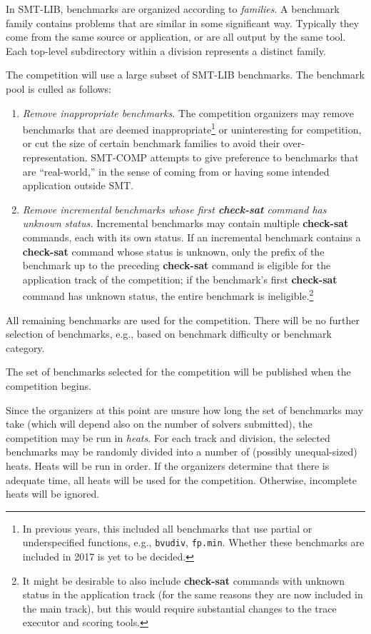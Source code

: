 \documentclass[12pt]{article}
\newcommand{\akey}[1]{\textbf{#1}}
\begin{document}
%
In SMT-LIB, benchmarks are organized according to \emph{families}.  A
benchmark family contains problems that are similar in some
significant way.  Typically they come from the same source or
application, or are all output by the same tool.  Each top-level
subdirectory within a division represents a distinct family.

%
The competition will use a large subset of SMT-LIB benchmarks.  The
benchmark pool is culled as follows:
\begin{enumerate}
\item \emph{Remove inappropriate benchmarks.} The competition
  organizers may remove benchmarks that are deemed
  inappropriate\footnote{In previous years, this included all
    benchmarks that use partial or underspecified functions, e.g.,
    \texttt{bvudiv}, \texttt{fp.min}.  Whether these benchmarks are
    included in 2017 is yet to be decided.} or uninteresting for
  competition, or cut the size of certain benchmark families to avoid
  their over-representation.  SMT-COMP attempts to give preference to
  benchmarks that are ``real-world,'' in the sense of coming from or
  having some intended application outside SMT.
\item \emph{Remove incremental benchmarks whose first \akey{check-sat}
  command has unknown status.}  Incremental benchmarks may contain
  multiple \akey{check-sat} commands, each with its own status.  If an
  incremental benchmark contains a \akey{check-sat} command whose
  status is unknown, only the prefix of the benchmark up to the
  preceding \akey{check-sat} command is eligible for the application
  track of the competition; if the benchmark's first \akey{check-sat}
  command has unknown status, the entire benchmark is
  ineligible.\footnote{It might be desirable to also include
    \akey{check-sat} commands with unknown status in the application
    track (for the same reasons they are now included in the main
    track), but this would require substantial changes to the trace
    executor and scoring tools.}
\end{enumerate}
%
All remaining benchmarks are used for the competition.  There will be
no further selection of benchmarks, e.g., based on benchmark
difficulty or benchmark category.

The set of benchmarks selected for the competition will be published
when the competition begins.

%
Since the organizers at this point are unsure how long the set of
benchmarks may take (which will depend also on the number of solvers
submitted), the competition may be run in \emph{heats}.  For each
track and division, the selected benchmarks may be randomly divided
into a number of (possibly unequal-sized) heats.  Heats will be run in
order.  If the organizers determine that there is adequate time, all
heats will be used for the competition.  Otherwise, incomplete heats
will be ignored.
\end{document}
